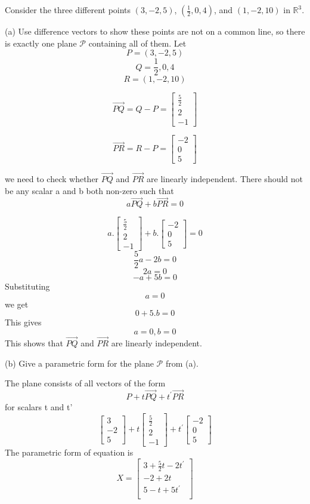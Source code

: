 Consider the three different points $(3,-2,5)$, $(\frac{1}{2},0,4)$, and $(1,-2,10)$ in $\mathbb{R}^3$.

(a) Use difference vectors to show these points are not on a common line, so there is exactly one plane $\mathcal{P}$ containing all of them.
Let 
\[
P = (3,-2,5)
\]
\[
Q = \frac{1}{2},0,4
\]
\[
R = (1,-2,10)
\]

\[
\overrightarrow{PQ} = Q - P = \begin{bmatrix}
\frac{5}{2} \\ 2 \\ -1
\end{bmatrix}
\]

\[
\overrightarrow{PR} = R - P = \begin{bmatrix}
-2 \\ 0 \\ 5
\end{bmatrix}
\]

we need to check whether $\overrightarrow{PQ}$ and $\overrightarrow{PR}$ are linearly independent.
There should not be any scalar a and b both non-zero such that
\[
a \overrightarrow{PQ} + b \overrightarrow{PR} = 0
\]

\[
a . \begin{bmatrix}
\frac{5}{2} \\ 2 \\ -1
\end{bmatrix} + b . \begin{bmatrix}
-2 \\ 0 \\ 5
\end{bmatrix} = 0
\]
\[
\frac{5}{2}a - 2b = 0
\]
\[
2a  = 0
\]
\[
-a + 5b = 0
\]
Substituting
\[
a = 0
\]
we get
\[
 0 + 5.b =0
\]
This gives
\[
a = 0, b = 0
\]
This shows that $\overrightarrow{PQ}$ and $\overrightarrow{PR}$ are linearly independent.


(b) Give a parametric form for the plane $\mathcal{P}$ from (a).

The plane consists of all vectors of the form
\[
P + t\overrightarrow{PQ}+t^\prime\overrightarrow{PR} 
\]
for scalars t and t'
\[
\begin{bmatrix}
3 \\ -2 \\ 5
\end{bmatrix} + t \begin{bmatrix}
\frac{5}{2} \\ 2 \\ -1
\end{bmatrix} + t^\prime \begin{bmatrix}
-2 \\ 0 \\ 5
\end{bmatrix}
\]
The parametric form of equation is
\[
X =
\begin{bmatrix}
    3+\frac{5}{2} t -2 t^\prime \\ 
    -2 + 2t  \\
    5 - t + 5 t^\prime \\
\end{bmatrix}
\]